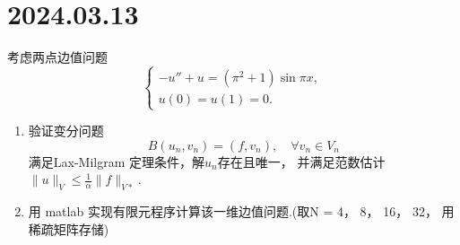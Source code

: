 \documentclass[12pt,a4paper]{article}
\begin{document}
	
	\noindent
	
	\section{2024.03.13}	
	
	
	考虑两点边值问题
	\begin{equation}
		\left\{
		\begin{array}{l}
			-u'' + u = (\pi^2 +1) \sin{\pi x}, \\
			u(0) = u(1) = 0.
		\end{array}
		\right.
	\end{equation}
	
	\begin{enumerate}
		
		\item 验证变分问题 $$B(u_n, v_n) = (f, v_n),\quad \forall v_n \in V_n$$ 满足Lax-Milgram 定理条件，解$u_n$存在且唯一， 并满足范数估计 $\|u\|_V \leq \frac{1}{\alpha} \|f\|_{V*} $.
		
		\item 用 matlab 实现有限元程序计算该一维边值问题.(取N = 4， 8， 16， 32， 用稀疏矩阵存储)
		
		
	\end{enumerate}
	
	
\end{document}
